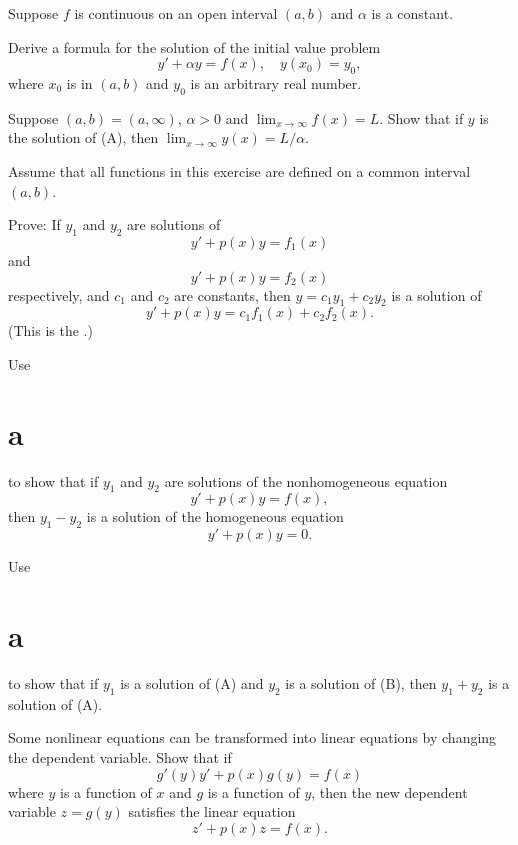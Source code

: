 \begin{exerciselist}
\item\label{exer:2.1.45}Suppose $f$ is continuous on an open interval $(a,b)$
and $\alpha$ is a constant.
\begin{alist}
\item %
Derive a formula for the solution of the initial value
problem
\renewcommand{\theequation}{\Alph{equation}}
\[
y'+\alpha y=f(x),\quad y(x_0)=y_0,\tag{A}
\]
where $x_0$ is in $(a,b)$ and $y_0$ is an arbitrary real number.

\item %
Suppose $(a,b)=(a,\infty)$, $\alpha > 0$ and
$\displaystyle{\lim_{x\to\infty} f(x)=L}$. Show that if $y$ is the
solution of (A), then $\displaystyle{\lim_{x\to
\infty} y(x)=L/\alpha}$.
\end{alist}

\item\label{exer:2.1.46}Assume that all functions in this exercise are defined on
a common interval $(a,b)$.
\begin{alist}
\item %
Prove:  If $y_1$ and $y_2$ are solutions of
\[
y'+p(x)y=f_1(x)
\]
and
\[
y'+p(x)y=f_2(x)
\]
respectively, and $c_1$ and $c_2$ are constants, then
$y=c_1y_1+c_2y_2$ is a solution of
\[
y'+p(x)y=c_1f_1(x)+c_2f_2(x).
\]
(This is the .)

\item %
Use \part{a} to show that if $y_1$ and $y_2$ are solutions
of the nonhomogeneous equation
\[
y'+p(x)y=f(x),\tag{A}
\]
then $y_1-y_2$ is a solution of the homogeneous equation
\[
y'+p(x)y=0.\tag{B}
\]

\item %
Use \part{a} to show that if $y_1$ is a solution of
(A) and $y_2$ is a solution of
(B), then $y_1+y_2$ is a solution of
(A).
\end{alist}

\item\label{exer:2.1.47}Some nonlinear equations can be transformed into linear
equations by changing the dependent variable.  Show that if
\[
g'(y)y'+p(x)g(y)=f(x)
\]
where $y$ is a function of $x$ and $g$ is a function of $y$,
then the new dependent variable $z=g(y)$ satisfies the
linear equation
\[
z'+p(x)z=f(x).
\]


\end{exerciselist}

